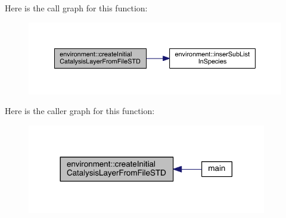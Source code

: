 Here is the call graph for this function\-:
\nopagebreak
\begin{figure}[H]
\begin{center}
\leavevmode
\includegraphics[width=350pt]{a00014_a29eeb7a1b4689c10fd872e82179b4d84_cgraph}
\end{center}
\end{figure}




Here is the caller graph for this function\-:
\nopagebreak
\begin{figure}[H]
\begin{center}
\leavevmode
\includegraphics[width=296pt]{a00014_a29eeb7a1b4689c10fd872e82179b4d84_icgraph}
\end{center}
\end{figure}


